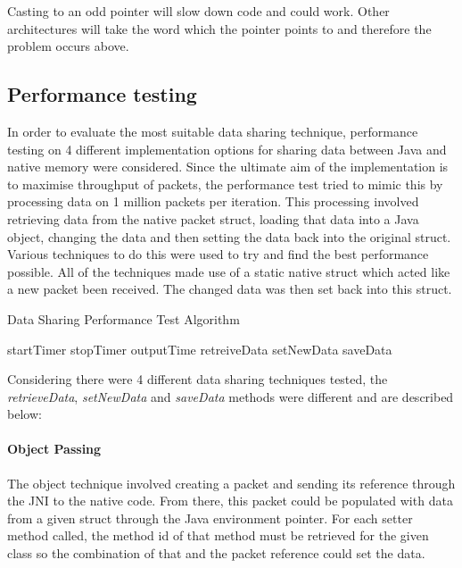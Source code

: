 \documentclass[final_report.tex]{subfiles}
\begin{document}
Casting to an odd pointer will slow down code and could work. Other architectures will take the word which the pointer points to and therefore the problem occurs above.

\subsection{Performance testing}
In order to evaluate the most suitable data sharing technique, performance testing on 4 different implementation options for sharing data between Java and native memory were considered. Since the ultimate aim of the implementation is to maximise throughput of packets, the performance test tried to mimic this by processing data on 1 million packets per iteration. This processing involved retrieving data from the native packet struct, loading that data into a Java object, changing the data and then setting the data back into the original struct. Various techniques to do this were used to try and find the best performance possible. All of the techniques made use of a static native struct which acted like a new packet been received. The changed data was then set back into this struct.

\begin{algorithm}[H]
	\caption{Data Sharing Performance Test Algorithm}
	\label{alg:data}
	\begin{algorithmic}[1]
				\State startTimer
				\State {}
				\State stopTimer
				\State outputTime				
			\EndFor
		\EndFunction
		\newline
				\State retreiveData
				\State setNewData
				\State saveData
			\EndFor
		\EndFunction
	\end{algorithmic}
\end{algorithm}

Considering there were 4 different data sharing techniques tested, the \textit{retrieveData}, \textit{setNewData} and \textit{saveData} methods were different and are described below:

\paragraph*{Object Passing}
The object technique involved creating a packet and sending its reference through the JNI to the native code. From there, this packet could be populated with data from a given struct through the Java environment pointer. For each setter method called, the method id of that method must be retrieved for the given class so the combination of that and the packet reference could set the data.
\end{document}
